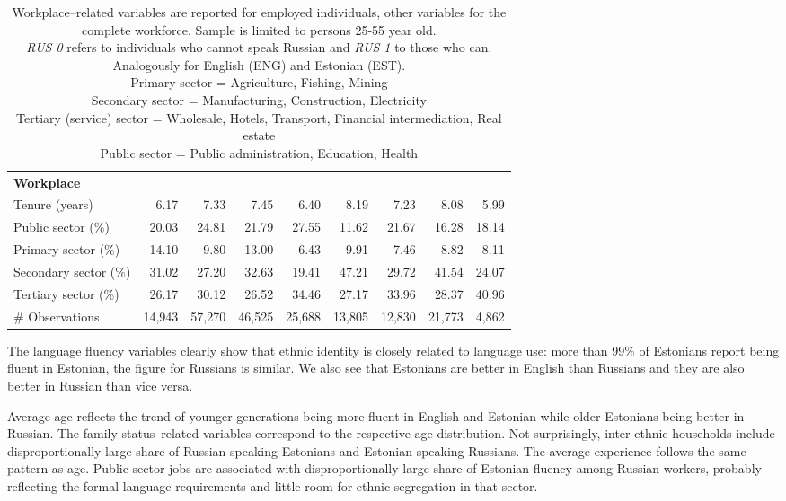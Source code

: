 \documentclass[12pt, a4paper]{article}
\begin{document}
\begin{table}
\begin{tabular}{l|rrrr|rrrr}
		\textbf{Workplace}          &        &        &        &        &        &        &        &        \\
		Tenure (years)              & 6.17   & 7.33   & 7.45   & 6.40   & 8.19   & 7.23   & 8.08   & 5.99   \\
		Public sector (\%)          & 20.03  & 24.81  & 21.79  & 27.55  & 11.62  & 21.67  & 16.28  & 18.14  \\
		Primary sector (\%)         & 14.10  & 9.80   & 13.00  & 6.43   & 9.91   & 7.46   & 8.82   & 8.11   \\
		Secondary sector (\%)       & 31.02  & 27.20  & 32.63  & 19.41  & 47.21  & 29.72  & 41.54  & 24.07  \\
		Tertiary sector (\%)        & 26.17  & 30.12  & 26.52  & 34.46  & 27.17  & 33.96  & 28.37  & 40.96  \\
		\# Observations             & 14,943 & 57,270 & 46,525 & 25,688 & 13,805 & 12,830 & 21,773 & 4,862  \\ \bottomrule
	\end{tabular}%
	\label{tab:descriptive}%
	\caption*{\small
		Workplace--related variables are reported for employed individuals,
		other variables for the complete workforce.  Sample is limited to persons
		25-55 year old.\\
		\emph{RUS 0} refers to individuals who cannot speak Russian and
		\emph{RUS 1} to those who can. Analogously for English
                (ENG) and
		Estonian (EST).\\
		Primary sector = Agriculture,
		Fishing, Mining \\ Secondary sector = Manufacturing,
		Construction, Electricity \\ Tertiary (service) sector =
		Wholesale, Hotels, Transport, Financial intermediation, Real
		estate \\ Public sector = Public administration, Education,
		Health}
\end{table}%

The language fluency variables clearly show that ethnic identity is
closely related to language use: more than 99\% of Estonians report
being fluent in Estonian, the figure for Russians is similar. We
also see that Estonians are better in English than Russians and they
are also better in Russian than vice versa.

Average age reflects the trend of younger generations
being more fluent in English and Estonian while older Estonians being
better in Russian. The family status--related variables correspond to the
respective age distribution. Not surprisingly, inter-ethnic
households include disproportionally large share of Russian speaking
Estonians and Estonian speaking Russians.
The average experience follows the same pattern as age.
Public sector jobs are associated with disproportionally large share of
Estonian fluency among Russian workers, probably reflecting the formal
language requirements and little room for ethnic segregation in that
sector.
\end{document}
